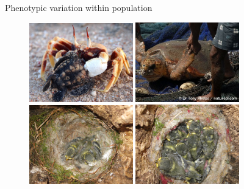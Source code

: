 \documentclass[10pt]{beamer}%
\begin{document}
\begin{frame}{Phenotypic variation within population}
	\begin{figure}
		\includegraphics[width=0.4\textwidth,height=0.3\textwidth]{Figures/babyTurtle} \hspace{1pt}
		\includegraphics[width=0.4\textwidth,height=0.3\textwidth]{Figures/adultTurtle}
		\vspace{1pt}
		\includegraphics[width=0.4\textwidth,height=0.3\textwidth]{Figures/BlueTits2}\hspace{1pt}
		\includegraphics[width=0.4\textwidth,height=0.3\textwidth]{Figures/BlueTits8}
	\end{figure}
\end{frame}

\end{document}
